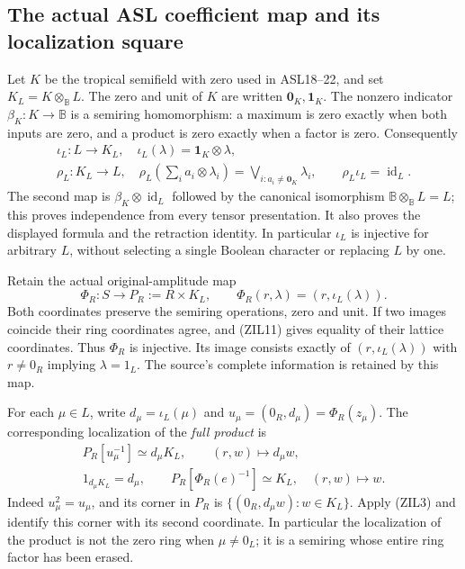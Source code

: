 \subsection{The actual ASL coefficient map and its localization square}

Let $K$ be the tropical semifield with zero used in ASL18--22, and set
$K_L=K\otimes_{\mathbb B}L$. The zero and unit of $K$ are written
$\mathbf0_K,\mathbf1_K$. The nonzero indicator
$\beta_K:K\to\mathbb B$ is a semiring homomorphism: a maximum is
zero exactly when both inputs are zero, and a product is zero
exactly when a factor is zero. Consequently
\begin{equation}\tag{ZIL11}
\begin{gathered}
 \iota_L:L\longrightarrow K_L,\quad
       \iota_L(\lambda)=\mathbf1_K\otimes\lambda,\\
 \rho_L:K_L\longrightarrow L,\quad
 \rho_L\left(\sum_i a_i\otimes\lambda_i\right)
       =\bigvee_{i:a_i\ne\mathbf0_K}\lambda_i,\qquad
 \rho_L\iota_L=\operatorname{id}_L.
\end{gathered}
\end{equation}
The second map is $\beta_K\otimes\operatorname{id}_L$ followed
by the canonical isomorphism $\mathbb B\otimes_{\mathbb B}L=L$;
this proves independence from every tensor presentation. It also
proves the displayed formula and the retraction identity.
In particular $\iota_L$ is injective for arbitrary $L$, without
selecting a single Boolean character or replacing $L$ by one.

Retain the actual original-amplitude map
\begin{equation}\tag{ZIL12}
 \Phi_R:S\longrightarrow P_R:=R\times K_L,\qquad
       \Phi_R(r,\lambda)=(r,\iota_L(\lambda)).
\end{equation}
Both coordinates preserve the semiring operations, zero and unit.
If two images coincide their ring coordinates agree, and (ZIL11)
gives equality of their lattice coordinates. Thus $\Phi_R$ is
injective. Its image consists exactly of
$(r,\iota_L(\lambda))$ with $r\ne0_R$ implying $\lambda=1_L$.
The source's complete information is retained by this map.

For each $\mu\in L$, write
$d_\mu=\iota_L(\mu)$ and $u_\mu=(0_R,d_\mu)=\Phi_R(z_\mu)$.
The corresponding localization of the \emph{full product} is
\begin{equation}\tag{ZIL13}
 \begin{gathered}
 P_R[u_\mu^{-1}]\simeq d_\mu K_L,
       \qquad(r,w)\longmapsto d_\mu w,\\
 1_{d_\mu K_L}=d_\mu,\qquad
 P_R[\Phi_R(e)^{-1}]\simeq K_L,\quad(r,w)\longmapsto w.
 \end{gathered}
\end{equation}
Indeed $u_\mu^2=u_\mu$, and its corner in $P_R$ is
$\{(0_R,d_\mu w):w\in K_L\}$. Apply (ZIL3) and identify this
corner with its second coordinate. In particular the localization
of the product is not the zero ring when $\mu\ne0_L$; it is a
semiring whose entire ring factor has been erased.

